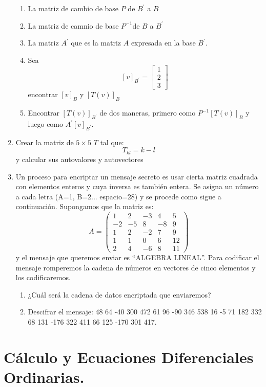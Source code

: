 \begin{enumerate}
  \begin{enumerate}
  \item La matriz de cambio de base $P$ de $B^{\prime}$ a $B$
  \item La matriz de camnio de base $P^{-1}$de $B$ a $B^{\prime}$
  \item La matriz $A^{\prime}$ que es la matriz $A$ expresada en la
    base $B^{\prime}$.
  \item Sea$$ [v]_{B^{\prime}}=\left[\begin{array}{c}
        1\\
        2\\
        3\end{array}\right]$$
 encontrar $[v]_{B}$ y $[T(v)]_{B}$
  \item Encontrar $[T(v)]_{B^{\prime}}$ de dos maneras, primero como
    $P^{-1}[T(v)]_{B}$ y luego como $A^{\prime}[v]_{B^{\prime}}$.
  \end{enumerate}
\item Crear la matriz de $5\times5$ $T$ tal que:
$$ T_{kl}=k-l$$ y
  calcular sus autovalores y autovectores
\item Un proceso para encriptar un mensaje secreto es usar cierta
  matriz cuadrada con elementos enteros y cuya inversa es también
  entera. Se asigna un número a cada letra (A=1, B=2... espacio=28) y
  se procede como sigue a continuación. Supongamos que la matriz es:
  $$A=\left(\begin{array}{ccccc}
      1 & 2 & -3 & 4 & 5\\
      -2 & -5 & 8 & -8 & 9\\
      1 & 2 & -2 & 7 & 9\\
      1 & 1 & 0 & 6 & 12\\
      2 & 4 & -6 & 8 & 11\end{array}\right)$$ y el mensaje que
  queremos enviar es {}``ALGEBRA LINEAL''. Para codificar el mensaje
  romperemos la cadena de números en vectores de cinco elementos y los
  codificaremos.

  \begin{enumerate}
  \item ¿Cuál será la cadena de datos encriptada que enviaremos?
  \item Descifrar el mensaje: 48 64 -40 300 472 61 96 -90 346 538 16
    -5 71 182 332 68 131 -176 322 411 66 125 -170 301 417.
  \end{enumerate}
\end{enumerate}

\section{Cálculo y Ecuaciones Diferenciales Ordinarias.}


